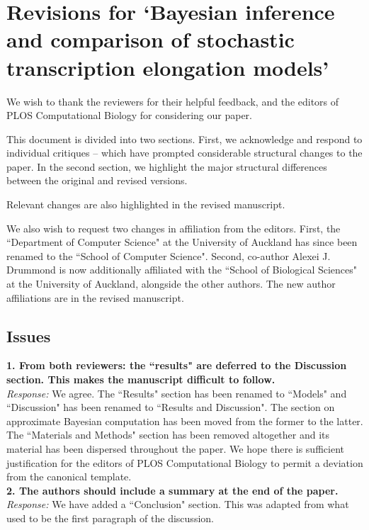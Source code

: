 \documentclass[12pt]{article}
\begin{document}
\section*{Revisions for `Bayesian inference and comparison of stochastic transcription elongation models'}




We wish to thank the reviewers for their helpful feedback, and the editors of PLOS Computational Biology for considering our paper.


This document is divided into two sections.  First, we acknowledge and respond to individual critiques -- which have prompted considerable structural changes to the paper. In the second section, we highlight the major structural differences between the original and revised versions.

Relevant changes are also highlighted in the revised manuscript.

We also wish to request two changes in affiliation from the editors. First, the ``Department of Computer Science" at the University of Auckland has since been renamed to the ``School of Computer Science". Second, co-author Alexei J. Drummond is now additionally affiliated with the ``School of Biological Sciences"  at the University of Auckland, alongside the other authors. The new author affiliations are in the revised manuscript.




\subsection*{Issues}


\noindent \textbf{1. From both reviewers: the ``results" are deferred to the Discussion section. This makes the manuscript difficult to follow.} \\
\textit{Response:} We agree. The ``Results" section has been renamed to ``Models" and ``Discussion" has been renamed to ``Results and Discussion". The section on approximate Bayesian computation has been moved from the former to the latter. The ``Materials and Methods" section has been removed altogether and its material has been dispersed throughout the paper. We hope there is sufficient justification for the editors of PLOS Computational Biology to permit a deviation from the canonical template. \\



\noindent \textbf{2.  The authors should include a summary at the end of the paper.} \\
\textit{Response:} We have added a ``Conclusion" section. This was adapted from what used to be the first paragraph of the discussion. \\
\end{document}
